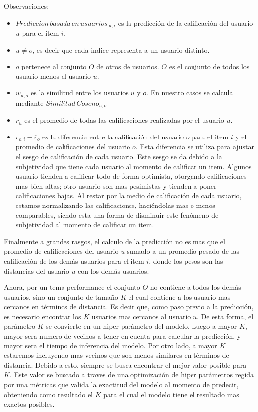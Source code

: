 \documentclass[11pt,a4paper,twoside]{thesis}
\begin{document}
\begin{description}
	\item[Observaciones:]
\end{description}
\begin{itemize}
	\item $Prediccion \mspace{3mu}basada \mspace{3mu}en \mspace{3mu}usuarios\mspace{3mu}_{u, i}$ es la predicción de la calificación del usuario $u$ para el item $i$.
	\item $u \neq o$, es decir que cada indice representa a un usuario distinto.
	\item $o$ pertenece al conjunto $O$ de otros de usuarios. $O$ es el conjunto de todos los usuario menos el usuario $u$.
	\item $w_{u,o}$ es la similitud entre los usuarios $u$ y $o$. En nuestro casos se calcula mediante $Similitud \mspace{3mu}Coseno_{u, o}$
	\item $\overline{r}_{u}$ es el promedio de todas las calificaciones realizadas por el usuario $u$.
 	\item $r_{o,i} - \overline{r}_{o}$ es la diferencia entre la calificación del usuario $o$ para el item $i$ y el promedio de calificaciones del usuario $o$. 
	 	Esta diferencia se utiliza para ajustar el sesgo de calificación de cada usuario. Este sesgo se da debido a la subjetividad que tiene cada usuario al 
		momento de calificar un item. Algunos usuario tienden a calificar todo de forma optimista, otorgando calificaciones mas bien altas; otro usuario son mas 
		pesimistas y tienden a poner calificaciones bajas. Al restar por la medio de calificación de cada usuario, estamos normalizando las calificaciones, haciéndolas mas o menos comparables, siendo esta una forma de disminuir este fenómeno de subjetividad al momento de calificar un item.
\end{itemize}

Finalmente a grandes rasgos, el calculo de la predicción no es mas que el promedio de calificaciones del usuario $u$ sumado a un promedio 
pesado de las calificación de los demás usuarios para el item $i$, donde los pesos son las distancias del usuario $u$ con los demás usuarios.

Ahora, por un tema performance el conjunto $O$ no contiene a todos los demás usuarios, sino un conjunto de tamaño $K$ el cual contiene a los 
usuario mas cercanos en términos de distancia. Es decir que, como paso previo a la predicción, es necesario encontrar los $K$ usuarios mas cercanos al usuario $u$.
De esta forma, el parámetro $K$ se convierte en un hiper-parámetro del modelo. Luego a mayor $K$, mayor sera numero de vecinos a tener en cuenta para calcular
la predicción, y mayor sera el tiempo de inferencia del modelo. Por otro lado, a mayor $K$ estaremos incluyendo mas vecinos que son menos similares en 
términos de distancia. Debido a esto, siempre se busca encontrar el mejor valor posible para $K$. Este valor se buscado a traves de una optimización de hiper parámetros regida por una métricas que valida la exactitud del modelo al momento de predecir, obteniendo como resultado el $K$ para el cual el modelo tiene el resultado mas exactos posibles.
\end{document}
